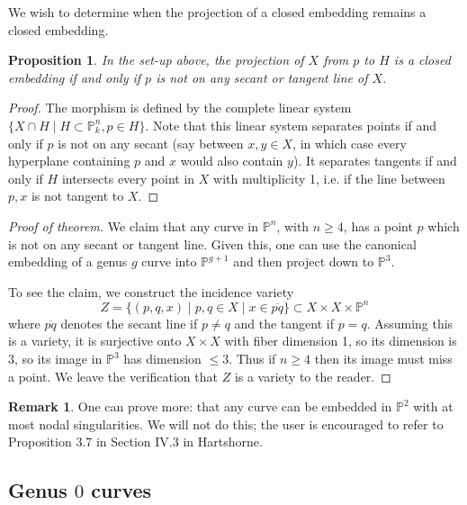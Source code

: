 \documentclass[10pt]{article}
\newtheorem{prop}[thm]{Proposition}
\theoremstyle{definition}
\newtheorem{rmk}[thm]{Remark}
\newcommand{\PP}{\mathbb{P}}
\begin{document}
We wish to determine when the projection of a closed embedding remains a closed embedding.  
\begin{prop}
In the set-up above, the projection of $X$ from $p$ to $H$ is a closed embedding if and only if $p$ is not on any secant or tangent line of $X$.
\end{prop}
\begin{proof}
The morphism is defined by the complete linear system $\{X \cap H \mid H \subset \PP^n_k, p \in H\}$.  Note that this linear system separates points if and only if $p$ is not on any secant (say between $x,y\in X$, in which case every hyperplane containing $p$ and $x$ would also contain $y$).  It separates tangents if and only if $H$ intersects every point in $X$ with multiplicity 1, i.e. if the line between $p, x$ is not tangent to $X$.
\end{proof}


\begin{proof}[Proof of theorem]
We claim that any curve in $\PP^n$, with $n \geq 4$, has a point $p$ which is not on any secant or tangent line.  Given this, one can use the canonical embedding of a genus $g$ curve into $\PP^{g+1}$ and then project down to $\PP^3$.

To see the claim, we construct the incidence variety
$$Z = \{(p, q, x) \mid p, q \in X \mid x \in \overline{pq} \} \subset X \times X \times \PP^n$$
where $\overline{pq}$ denotes the secant line if $p \neq q$ and the tangent if $p=q$.  Assuming this is a variety, it is surjective onto $X \times X$ with fiber dimension 1, so its dimension is $3$, so its image in $\PP^3$ has dimension $\leq 3$.  Thus if $n \geq 4$ then its image must miss a point.  We leave the verification that $Z$ is a variety to the reader.
\end{proof}

\begin{rmk}
One can prove more: that any curve can be embedded in $\PP^2$ with at most nodal singularities.  We will not do this; the user is encouraged to refer to Proposition 3.7 in Section IV.3 in Hartshorne.
\end{rmk}

\subsection{Genus $0$ curves}

\end{document}
